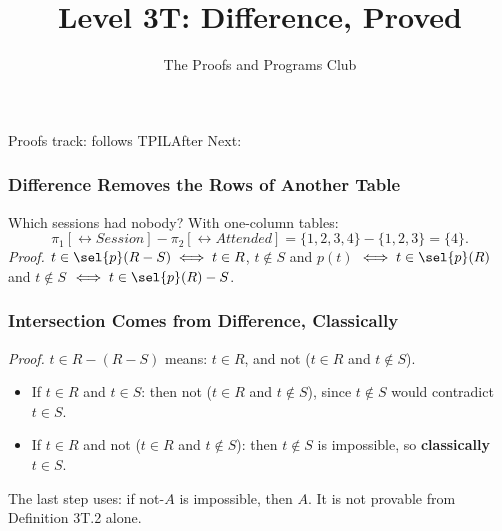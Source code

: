 \documentclass{ltx-talk}
\title{Level 3T: Difference, Proved}
\author{The Proofs and Programs Club}
\institute{Royal Holloway, University of London}
\begin{document}
  {Proofs track: follows TPIL}{After }
  {Next: }



\begin{frame}
  \frametitle{Difference Removes the Rows of Another Table}
  Which sessions had nobody? With one-column tables:
  \[
    \pi_1[\rel{Session}] - \pi_2[\rel{Attended}] = \{1, 2, 3, 4\} - \{1,
    2, 3\} = \{4\}.
  \]
  \emph{Proof.} $t \in \sel{p}(R - S) \iff t \in R$, $t \notin S$ and
  $p(t)$ $\iff t \in \sel{p}(R)$ and $t \notin S$ $\iff t \in \sel{p}(R)
  - S$. \proofend
\end{frame}

\begin{frame}
  \frametitle{Intersection Comes from Difference, Classically}
  \emph{Proof.} $t \in R - (R - S)$ means: $t \in R$, and not ($t \in R$
  and $t \notin S$).
  \begin{itemize}
    \item If $t \in R$ and $t \in S$: then not ($t \in R$ and
      $t \notin S$), since $t \notin S$ would contradict $t \in S$.
    \item If $t \in R$ and not ($t \in R$ and $t \notin S$): then
      $t \notin S$ is impossible, so \textbf{classically} $t \in S$.
      \proofend
  \end{itemize}
  The last step uses: if not-$A$ is impossible, then $A$. It is not
  provable from Definition 3T.2 alone.
\end{frame}
\end{document}
